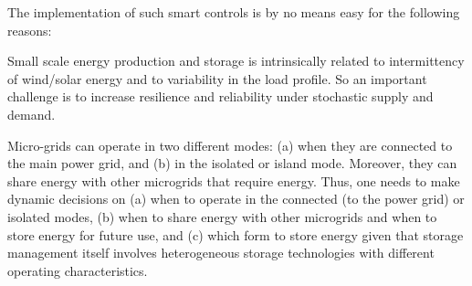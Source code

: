 The implementation of such smart controls is by no means easy for the following reasons:
\begin{inparaenum}[\bfseries (i)]
\item Small scale energy production and storage is intrinsically
         related to intermittency of wind/solar energy and to variability in the load profile.
          So an important challenge is to increase resilience and reliability under stochastic supply and
                 demand.
\item Micro-grids can operate in two different modes: (a) when they are connected to the
main power grid, and (b) in the isolated or island mode. Moreover, they can share energy with
other microgrids that require energy. Thus, one needs to make
dynamic decisions on (a) when to operate in the connected (to the power grid) or isolated modes, 
(b) when to share energy with other microgrids and when to store energy for future use, and (c) 
which form to store energy given that storage management itself
involves heterogeneous storage technologies with different
operating characteristics.
\end{inparaenum}



